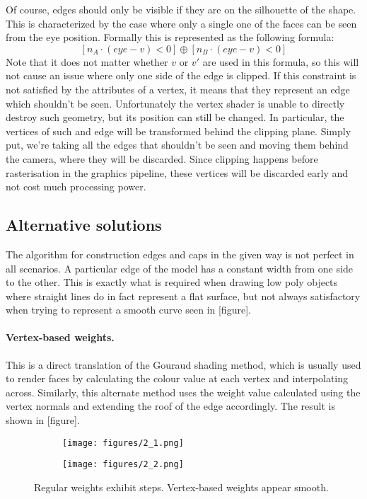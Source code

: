 \documentclass[a4paper, 12pt]{article}
\begin{document}
Of course, edges should only be visible if they are on the silhouette of the shape. This is characterized by the case where only a single one of the faces can be seen from the eye position. Formally this is represented as the following formula:
$$[n_A \cdot (eye-v) < 0] \oplus [n_B \cdot (eye-v) < 0]$$
Note that it does not matter whether $v$ or $v'$ are used in this formula, so this will not cause an issue where only one side of the edge is clipped. If this constraint is not satisfied by the attributes of a vertex, it means that they represent an edge which shouldn't be seen. Unfortunately the vertex shader is unable to directly destroy such geometry, but its position can still be changed. In particular, the vertices of such and edge will be transformed behind the clipping plane. Simply put, we're taking all the edges that shouldn't be seen and moving them behind the camera, where they will be discarded. Since clipping happens before rasterisation in the graphics pipeline, these vertices will be discarded early and not cost much processing power.


\subsection{Alternative solutions}
The algorithm for construction edges and caps in the given way is not perfect in all scenarios. A particular edge of the model has a constant width from one side to the other. This is exactly what is required when drawing low poly objects where straight lines do in fact represent a flat surface, but not always satisfactory when trying to represent a smooth curve seen in [figure].

\paragraph{Vertex-based weights.}
This is a direct translation of the Gouraud shading method, which is usually used to render faces by calculating the colour value at each vertex and interpolating across. Similarly, this alternate method uses the weight value calculated using the vertex normals and extending the roof of the edge accordingly. The result is shown in [figure].

\begin{figure}
  \centering
  \begin{subfigure}{0.3\columnwidth}
    \texttt{[image: figures/2\_1.png]}
  \end{subfigure}
  \begin{subfigure}{0.3\columnwidth}
    \texttt{[image: figures/2\_2.png]}
  \end{subfigure}
  \caption{Regular weights exhibit steps. Vertex-based weights appear smooth.}
\end{figure}
\end{document}
